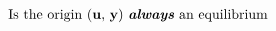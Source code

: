 \documentclass[preview]{standalone}
\begin{document}
\begin{align*}
\text{Is the origin (\textbf{u}, \textbf{y}) \textbf{\emph{always}} an equilibrium}
\end{align*}
\end{document}
